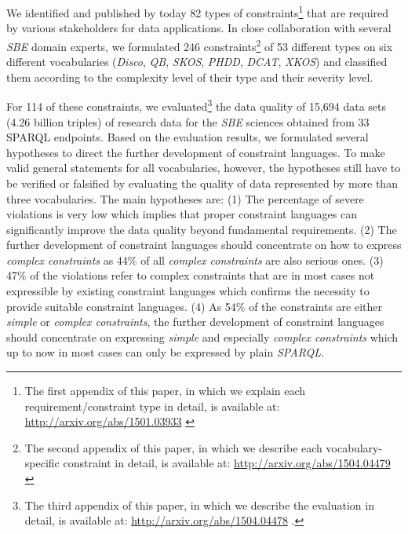 \documentclass{llncs}
\begin{document}
We identified and published by today 82 types of constraints\footnote{The first appendix of this paper, in which we explain each requirement/constraint type in detail, is available at: \url{http://arxiv.org/abs/1501.03933} \cite{BoschNolleAcarEckert2015}}
that are required by various stakeholders for data applications.
In close collaboration with several \emph{SBE} domain experts, we formulated 246 constraints\footnote{The second appendix of this paper, in which we describe each vocabulary-specific constraint in detail, is available at: \url{http://arxiv.org/abs/1504.04479} \cite{BoschZapilkoWackerowEckert2015}}
 of 53 different types on six different vocabularies (\emph{Disco}, \emph{QB}, \emph{SKOS}, \emph{PHDD}, \emph{DCAT}, \emph{XKOS}) and classified them according to the complexity level of their type and their severity level. 

For 114 of these constraints, we evaluated\footnote{The third appendix of this paper, in which we describe the evaluation in detail, is available at: \url{http://arxiv.org/abs/1504.04478} \cite{BoschZapilkoWackerowEckert2015-2}.}
 the data quality of 15,694 data sets (4.26 billion triples) of research data for the \emph{SBE} sciences obtained from 33 SPARQL endpoints.
Based on the evaluation results,
we formulated several hypotheses to direct the further development of constraint languages.
To make valid general statements for all vocabularies, however,
the hypotheses still have to be verified or falsified
by evaluating the quality of data represented by more than three vocabularies.
The main hypotheses are: 
(1) The percentage of severe violations is very low which implies that proper constraint languages can significantly improve the data quality beyond fundamental requirements.
(2) The further development of constraint languages should concentrate on how to express \emph{complex constraints} as 44\% of all \emph{complex constraints} are also serious ones.
(3) 47\% of the violations refer to complex constraints that are in most cases not expressible by existing constraint languages which confirms the necessity to provide suitable constraint languages.
(4) As 54\% of the constraints are either \emph{simple} or \emph{complex constraints},
the further development of constraint languages should concentrate on expressing \emph{simple} and especially \emph{complex constraints} which up to now in most cases can only be expressed by plain \emph{SPARQL}. 

{}

\setcounter{tocdepth}{1}
\end{document}
